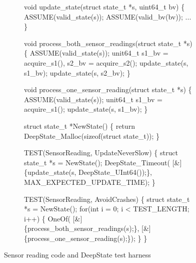\begin{figure}[t]
  \hspace{-12pt}
  \begin{subfigure}{0.492\columnwidth}
  {\scriptsize
  \begin{code}
void update\_state(struct state\_t *s, uint64\_t bv) \{
  ASSUME(valid\_state(s));
  ASSUME(valid\_bv(bv));
  ...
\}

void process\_both\_sensor\_readings(struct state\_t *s) \{
  ASSUME(valid\_state(s)); 
  unit64\_t s1\_bv = acquire\_s1(), s2\_bv = acquire\_s2();   
  update\_state(s, s1\_bv);  update\_state(s, s2\_bv);  
\}
  
void process\_one\_sensor\_reading(struct state\_t *s) \{
  ASSUME(valid\_state(s)); 
  unit64\_t s1\_bv = acquire\_s1(); 
  update\_state(s, s1\_bv); 
\}
\end{code}
}
\end{subfigure}
\begin{subfigure}{0.492\columnwidth}
{\scriptsize
\begin{code}
struct state\_t *NewState() \{
  return DeepState\_Malloc(sizeof(struct state\_t));   
\}
    
TEST(SensorReading, UpdateNeverSlow) \{
  struct state\_t *s = NewState();
  DeepState\_Timeout(
    [\&]\{update\_state(s, DeepState\_UInt64());\},
    MAX\_EXPECTED\_UPDATE\_TIME);
\}

TEST(SensorReading, AvoidCrashes) \{
  struct state\_t *s = NewState();
  for(int i = 0; i < TEST\_LENGTH; i++) \{
    OneOf(
        [\&]\{process\_both\_sensor\_readings(s);\},
        [\&]\{process\_one\_sensor\_reading(s);\});
  \}
\} 
\end{code}
}
\end{subfigure}
  \caption{Sensor reading code and DeepState test harness}
  \label{fig:assumption}
  \end{figure}

